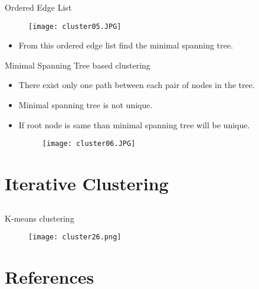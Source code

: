 \begin{frame}{Ordered Edge List}
\begin{figure}
\texttt{[image: cluster05.JPG]}
\end{figure}
\begin{itemize}
\item From this ordered edge list find the minimal spanning tree.
\end{itemize}
\end{frame}

\begin{frame}{Minimal Spanning Tree based clustering}
\begin{itemize}
\item There exist only one path between each pair of nodes in the tree.
\item Minimal spanning tree is not unique.
\item If root node is same than minimal spanning tree will be unique.
\begin{figure}
\texttt{[image: cluster06.JPG]}
\end{figure}
\end{itemize}
\end{frame}

\section{Iterative Clustering}
\subsection{}
\begin{frame}{K-means clustering}
\begin{figure}
\texttt{[image: cluster26.png]}
\end{figure}
\end{frame}

\section{References}
